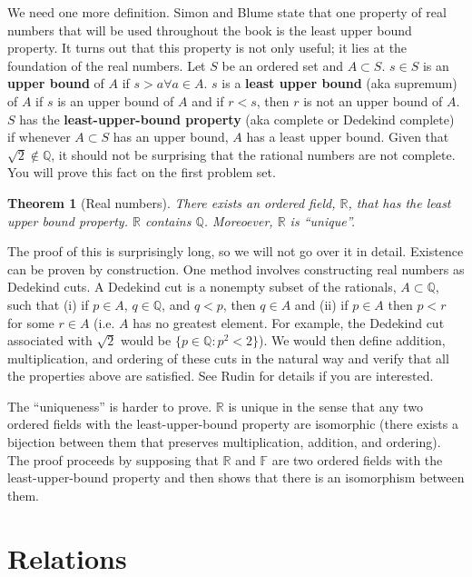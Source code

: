 \documentclass[12pt,reqno]{amsart}
\newtheorem{theorem}{Theorem}[section]
\theoremstyle{definition}
\begin{document}
We need one more definition. Simon and Blume state that one property
of real numbers that will be used throughout the book is the least
upper bound property. It turns out that this property is not only
useful; it lies at the foundation of the real numbers. Let $S$ be an
ordered set and $A \subset S$. $s \in S$ is an \textbf{upper bound} of
$A$ if $s > a \forall a \in A$. $s$ is a \textbf{least upper bound}
(aka supremum) of $A$ if $s$ is an upper bound of $A$ and if $r < s$,
then $r$ is not an upper bound of $A$. $S$ has the
\textbf{least-upper-bound property} (aka complete or Dedekind
complete) if whenever $A \subset S$ has an upper bound, $A$ has a
least upper bound. Given that $\sqrt{2} \not\in \mathbb{Q}$, it should
not be surprising that the rational numbers are not complete. You will
prove this fact on the first problem set. 

\begin{theorem}[Real numbers]
  There exists an ordered field, $\mathbb{R}$, that has the least
  upper bound property. $\mathbb{R}$ contains $\mathbb{Q}$. Moreoever,
  $\mathbb{R}$ is ``unique''.
\end{theorem}

The proof of this is surprisingly long, so we will not go over it in
detail. Existence can be proven by construction. One method involves
constructing real numbers as Dedekind cuts. A Dedekind cut is a
nonempty subset of the rationals, $A \subset \mathbb{Q}$, such that
(i) if $p \in A$, $q \in \mathbb{Q}$, and $q < p$, then $q \in A$ and
(ii) if $p \in A$ then $p<r$ for some $r \in A$ (i.e. $A$ has no
greatest element. For example, the Dedekind cut associated with
$\sqrt{2}$ would be $\{p \in \mathbb{Q}: p^2 < 2\}$). We would then
define addition, multiplication, and ordering of these cuts in the
natural way and verify that all the properties above are
satisfied. See Rudin for details if you are interested.

The ``uniqueness'' is harder to prove. $\mathbb{R}$ is unique in the
sense that any two ordered fields with the least-upper-bound property
are isomorphic (there exists a bijection between them that preserves
multiplication, addition, and ordering). The proof proceeds by
supposing that $\mathbb{R}$ and $\mathbb{F}$ are two ordered fields
with the least-upper-bound property and then shows that there is an
isomorphism between them.

\section{Relations}
\end{document}
